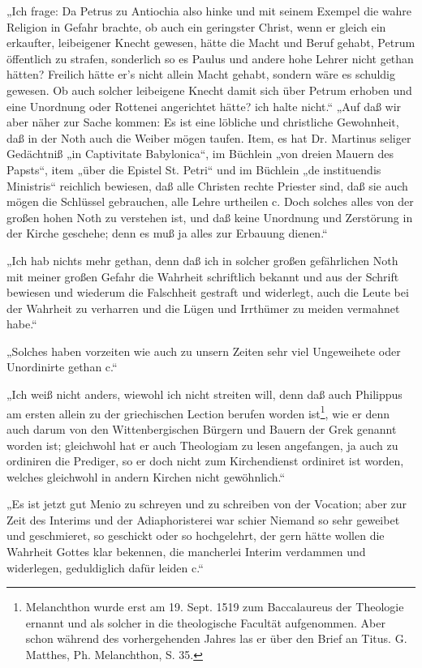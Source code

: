„Ich frage: Da Petrus zu Antiochia also hinke und mit seinem Exempel die wahre Religion in Gefahr brachte, ob auch
ein geringster Christ, wenn er gleich ein erkaufter, leibeigener Knecht gewesen, hätte die Macht und Beruf gehabt,
Petrum öffentlich zu strafen, sonderlich so es Paulus und andere hohe Lehrer nicht gethan hätten? Freilich hätte
er’s nicht allein Macht gehabt, sondern wäre es schuldig gewesen. Ob auch solcher leibeigene Knecht damit sich
über Petrum erhoben und eine Unordnung oder Rottenei angerichtet hätte? ich halte nicht.“
„Auf daß wir aber näher zur Sache kommen: Es ist eine löbliche und christliche Gewohnheit, daß in der Noth
auch die Weiber mögen taufen. Item, es hat Dr. Martinus seliger Gedächtniß „in Captivitate Babylonica“,
im Büchlein „von dreien Mauern des Papsts“, item „über die Epistel St. Petri“ und im Büchlein „de
instituendis Ministris“ reichlich bewiesen, daß alle Christen rechte Priester sind, daß sie auch mögen die
Schlüssel gebrauchen, alle Lehre urtheilen c. Doch solches alles von der großen hohen Noth zu verstehen ist,
und daß keine Unordnung und Zerstörung in der Kirche geschehe; denn es muß ja alles zur Erbauung dienen.“

„Ich hab nichts mehr gethan, denn daß ich in solcher großen gefährlichen Noth mit meiner großen Gefahr die
Wahrheit schriftlich bekannt und aus der Schrift bewiesen und wiederum die Falschheit gestraft und widerlegt,
auch die Leute bei der Wahrheit zu verharren und die Lügen und Irrthümer zu meiden vermahnet habe.“

„Solches haben vorzeiten wie auch zu unsern Zeiten sehr viel Ungeweihete oder Unordinirte gethan c.“

„Ich weiß nicht anders, wiewohl ich nicht streiten will, denn daß auch Philippus am ersten allein zu der
griechischen Lection berufen worden ist\footnote{Melanchthon wurde erst am 19. Sept. 1519 zum Baccalaureus der Theologie ernannt und als solcher in die theologische Facultät aufgenommen. Aber schon während des vorhergehenden Jahres las er über den Brief an Titus. G. Matthes, Ph. Melanchthon, S. 35.}, wie er denn auch darum von den Wittenbergischen Bürgern und Bauern der
Grek genannt worden ist; gleichwohl hat er auch Theologiam zu lesen angefangen, ja auch zu ordiniren die Prediger,
so er doch nicht zum Kirchendienst ordiniret ist worden, welches gleichwohl in andern Kirchen nicht gewöhnlich.“

„Es ist jetzt gut Menio zu schreyen und zu schreiben von der Vocation; aber zur Zeit des Interims und der
Adiaphoristerei war schier Niemand so sehr geweibet und geschmieret, so geschickt oder so hochgelehrt, der gern
hätte wollen die Wahrheit Gottes klar bekennen, die mancherlei Interim verdammen und widerlegen, geduldiglich
dafür leiden c.“

